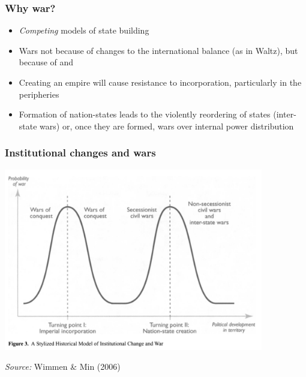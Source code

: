 \documentclass[aspectratio=43]{beamer}
\begin{document}
\begin{frame}
\frametitle{Why war?}
\centering

\begin{itemize}
  \item \textit{Competing} models of state building
  \item Wars not because of changes to the international balance (as in Waltz), but because of  and 
  \item Creating an empire will cause resistance to incorporation, particularly in the peripheries
  \item Formation of nation-states leads to the violently reordering of states (inter-state wars) or, once they are formed, wars over internal power distribution
\end{itemize}

\end{frame}


\begin{frame}
\frametitle{Institutional changes and wars}
\centering

\includegraphics[width = 0.85\textwidth]{img/wimmer_min_fig3}

{\scriptsize \textit{Source:} Wimmen \& Min (2006)}

\end{frame}
\end{document}
